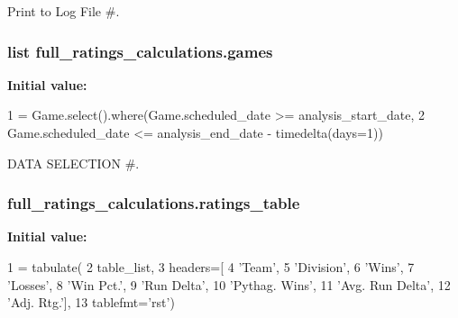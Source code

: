 Print to Log File \#. 

\subsubsection[{\texorpdfstring{games}{games}}]{\setlength{\rightskip}{0pt plus 5cm}list full\+\_\+ratings\+\_\+calculations.\+games}\hypertarget{namespacefull__ratings__calculations_ad7fbe206580dbeabe107c6ac5b3fe020}{}\label{namespacefull__ratings__calculations_ad7fbe206580dbeabe107c6ac5b3fe020}
{\bfseries Initial value\+:}
\begin{DoxyCode}
1 = Game.select().where(Game.scheduled\_date >= analysis\_start\_date,
2                             Game.scheduled\_date <= analysis\_end\_date - timedelta(days=1))
\end{DoxyCode}


D\+A\+TA S\+E\+L\+E\+C\+T\+I\+ON \#. 

\subsubsection[{\texorpdfstring{ratings\+\_\+table}{ratings_table}}]{\setlength{\rightskip}{0pt plus 5cm}full\+\_\+ratings\+\_\+calculations.\+ratings\+\_\+table}\hypertarget{namespacefull__ratings__calculations_ada660b21a1fe682bdaac6a53fb2844a8}{}\label{namespacefull__ratings__calculations_ada660b21a1fe682bdaac6a53fb2844a8}
{\bfseries Initial value\+:}
\begin{DoxyCode}
1 = tabulate(
2     table\_list,
3     headers=[
4         \textcolor{stringliteral}{'Team'},
5         \textcolor{stringliteral}{'Division'},
6         \textcolor{stringliteral}{'Wins'},
7         \textcolor{stringliteral}{'Losses'},
8         \textcolor{stringliteral}{'Win Pct.'},
9         \textcolor{stringliteral}{'Run Delta'},
10         \textcolor{stringliteral}{'Pythag. Wins'},
11         \textcolor{stringliteral}{'Avg. Run Delta'},
12         \textcolor{stringliteral}{'Adj. Rtg.'}],
13     tablefmt=\textcolor{stringliteral}{'rst'})
\end{DoxyCode}
